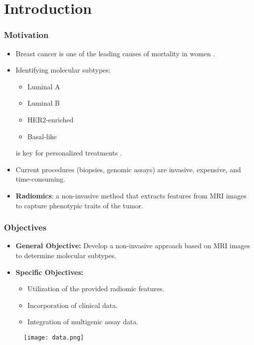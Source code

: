 \section{Introduction}


\begin{frame}
    \frametitle{Motivation}
    \vspace{3mm}
	  \begin{itemize}
	        \item Breast cancer is one of the leading causes of mortality in women \cite{breast_cancer}.
		\vspace{3mm}
	        \item Identifying molecular subtypes:
			\begin{itemize}
				\item Luminal A
				\item Luminal B
				\item HER2-enriched
				\item Basal-like
			\end{itemize}
			 is key for personalized treatments \cite{b1}.
	           \vspace{3mm}
		 \item Current procedures (biopsies, genomic assays) are invasive, expensive, and time-consuming.
		\vspace{3mm}	        
		\item \textbf{Radiomics}: a non-invasive method that extracts features from MRI images to capture phenotypic traits of the tumor.
	    \end{itemize}
    \vfill 
\end{frame}


\begin{frame}
    \frametitle{Objectives}
    \vspace{3mm}
	    \begin{itemize}
	        \item \textbf{General Objective:} Develop a non-invasive approach based on MRI images to determine molecular subtypes.
	            \vspace{5mm}
		\item \textbf{Specific Objectives:}
	        \begin{itemize}
	            \item Utilization of the provided radiomic features.
	            \item Incorporation of clinical data.
	            \item Integration of multigenic assay data.
	        \end{itemize}
	    \end{itemize}
\vspace{-4mm}
   \begin{figure}[h]
        \centering
        \texttt{[image: data.png]}
        \label{fig:data_overview}
    \end{figure}

    \vfill 
\end{frame}